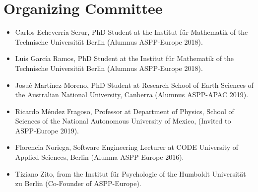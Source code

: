 \documentclass{article}[11pt]
\begin{document}

\section*{Organizing Committee}
\begin{itemize}
    \item Carlos Echeverr\'ia Serur, PhD Student at the Institut f\"ur Mathematik of the Technische Universit\"at Berlin (Alumnus ASPP-Europe 2018).

    \item Luis Garc\'ia Ramos, PhD Student at the Institut f\"ur Mathematik of the Technische Universit\"at Berlin (Alumnus ASPP-Europe 2018).
    
    \item Josu\'e Mart\'inez Moreno, PhD Student at Research School of Earth Sciences of the Australian National University, Canberra (Alumnus ASPP-APAC 2019).

    \item Ricardo M\'endez Fragoso, Professor at Department of Physics, School of Sciences of the National Autonomous University of Mexico, (Invited to ASPP-Europe 2019).
    
    \item Florencia Noriega, Software Engineering Lecturer at CODE University of Applied Sciences, Berlin (Alumna ASPP-Europe 2016).
  
    \item Tiziano Zito, from the Institut f\"ur Psychologie of the Humboldt Universit\"at zu Berlin (Co-Founder of ASPP-Europe).

\end{itemize}
\end{document}
